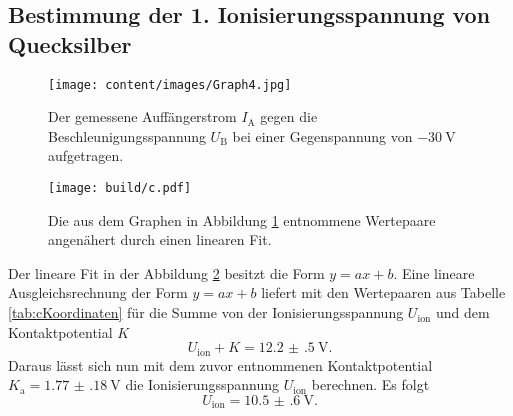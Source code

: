 \subsection{Bestimmung der 1. Ionisierungsspannung von Quecksilber}
\begin{figure}
	\centering
	\caption{Der gemessene Auffängerstrom $I_\text{A}$ gegen die Beschleunigungsspannung $U_\text{B}$ bei einer Gegenspannung von $\SI{-30}{\volt}$ aufgetragen.}
	\texttt{[image: content/images/Graph4.jpg]}
	\label{fig:c}
\end{figure}
\begin{figure}
	\centering
	\caption{Die aus dem Graphen in Abbildung \ref{fig:c} entnommene Wertepaare angenähert durch einen linearen Fit.}
	\texttt{[image: build/c.pdf]}
	\label{fig:cion}
\end{figure}
\begin{table}
	\caption{Die aus dem Graphen in Abbildung \ref{fig:c} entnommenen Wertepaare.}
	\centering
	
\end{table}
Der lineare Fit in der Abbildung \ref{fig:cion} besitzt die Form $y=a x + b$. Eine lineare Ausgleichsrechnung der Form $y=a x+b$ liefert mit den Wertepaaren aus Tabelle \ref{tab:cKoordinaten} für die Summe von der Ionisierungsspannung $U_\text{ion}$ und dem Kontaktpotential $K$
\begin{displaymath}
	U_\text{ion}+K=\SI{12.2(5)}{\volt}\text{.}
\end{displaymath}
Daraus lässt sich nun mit dem zuvor entnommenen Kontaktpotential $K_\text{a}=\SI{1.77(18)}{\volt}$ die Ionisierungsspannung $U_\text{ion}$ berechnen. Es folgt
\begin{displaymath}
U_\text{ion}=\SI{10.5(6)}{\volt}\text{.}
\end{displaymath}

\begin{table}
	\caption{Die Ergebnisse aus der Auswertung.}
	\centering
	
	\label{tab:erg}
\end{table}
